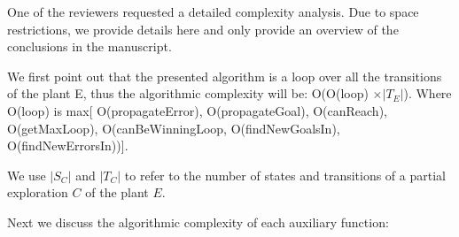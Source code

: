\vspace{2cm}




One of the reviewers requested a detailed complexity analysis. Due to space 
restrictions, 
we provide details here and only provide an overview of the conclusions in the 
manuscript. 


We first point out that the presented algorithm is a loop over all the transitions of the 
plant E, thus the algorithmic complexity will be: O(O(loop) $\times |T_{E}|$).
Where O(loop) is  max[ O(propagateError), O(propagateGoal), O(canReach), O(getMaxLoop),  
O(canBeWinningLoop, O(findNewGoalsIn),  O(findNewErrorsIn))]. 

We use $|S_C|$ and $|T_C|$ to refer to the number of states and transitions of a 
partial 
exploration $C$ of the plant $E$.

Next we discuss the algorithmic complexity of each auxiliary function:

